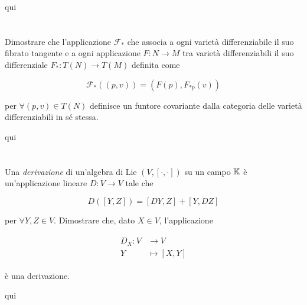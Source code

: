 qui

%

\newpage

%

\section{}\label{es2-27}

\begin{tcolorbox}
	Dimostrare che l'applicazione $ \mathcal{F}_{*} $ che associa a ogni varietà differenziabile il suo fibrato tangente e a ogni applicazione $ F : N \to M $ tra varietà differenziabili il suo differenziale $ F_{*} : T(N) \to T(M) $ definita come
	
	\begin{equation}
		\mathcal{F}_{*}((p,v)) = (F(p), F_{*p}(v))
	\end{equation}
	
	per $ \forall (p,v) \in T(N) $ definisce un funtore covariante dalla categoria delle varietà differenziabili in sé stessa.
\end{tcolorbox}

qui

%

\newpage

%

\section{}\label{es2-28}

\begin{tcolorbox}
	Una \textit{derivazione} di un'algebra di Lie $ (V,[\cdot,\cdot]) $ su un campo $ \mathbb{K} $ è un'applicazione lineare $ D : V \to V $ tale che
	
	\begin{equation}
		D([Y,Z]) = [DY,Z] + [Y,DZ]
	\end{equation}
	
	per $ \forall Y,Z \in V $. Dimostrare che, dato $ X \in V $, l'applicazione
	
	\begin{align}
		\begin{split}
			D_{X} : V &\to V\\
			Y &\mapsto [X,Y]
		\end{split}
	\end{align}
	
	è una derivazione.
\end{tcolorbox}

qui

